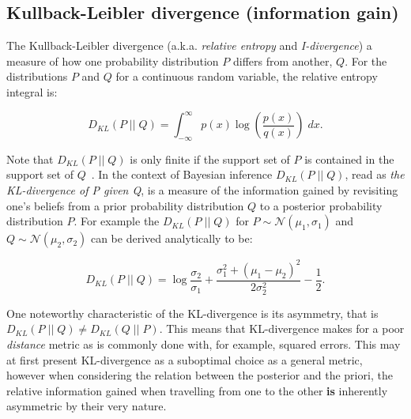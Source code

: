 \subsection{Kullback-Leibler divergence (information gain)}\label{sec:kl_div}

The Kullback-Leibler divergence (a.k.a. \textit{relative entropy} and
\textit{I-divergence}) a measure of how one probability distribution $P$ differs
from another, $Q$. For the distributions $P$ and $Q$ for a continuous random
variable, the relative entropy integral is:

\begin{equation}
    D_{KL}(P\;||\;Q) = \int_{-\infty}^{\infty}p(x)\log(\frac{p(x)}{q(x)})\;dx.
    \label{eq:kullback-leibler}
\end{equation}

Note that $D_{KL}(P\;||\;Q)$ is only finite if the support set of $P$ is contained in the support set of $Q$~\cite[p.~251]{Cover2006}. In the context of Bayesian inference $D_{KL}(P\;||\;Q)$, read as \textit{the KL-divergence of P given Q}, is a measure of the information gained by revisiting one's beliefs from a prior probability distribution $Q$ to a posterior probability distribution $P$. For example the $D_{KL}(P\;||\;Q)$ for $P\sim{}\mathcal{N}(\mu_1,\sigma_1)$ and $Q\sim{}\mathcal{N}(\mu_2,\sigma_2)$ can be derived analytically to be:

\begin{equation}
    D_{KL}(P\;||\;Q) = \log\frac{\sigma_2}{\sigma_1} + \frac{\sigma_1^2 + (\mu_1-\mu_2)^2}{2\sigma_2^2} - \frac{1}{2}.
\end{equation}
%

One noteworthy characteristic of the KL-divergence is its asymmetry, that is
$D_{KL}(P\;||\;Q)\neq{}D_{KL}(Q\;||\;P)$. This means that KL-divergence makes
for a poor \textit{distance} metric as is commonly done with, for example,
squared errors. This may at first present KL-divergence as a suboptimal choice
as a general metric, however when considering the relation between the posterior
and the priori, the relative information gained when travelling from one to the
other \textbf{is} inherently asymmetric by their very nature.

